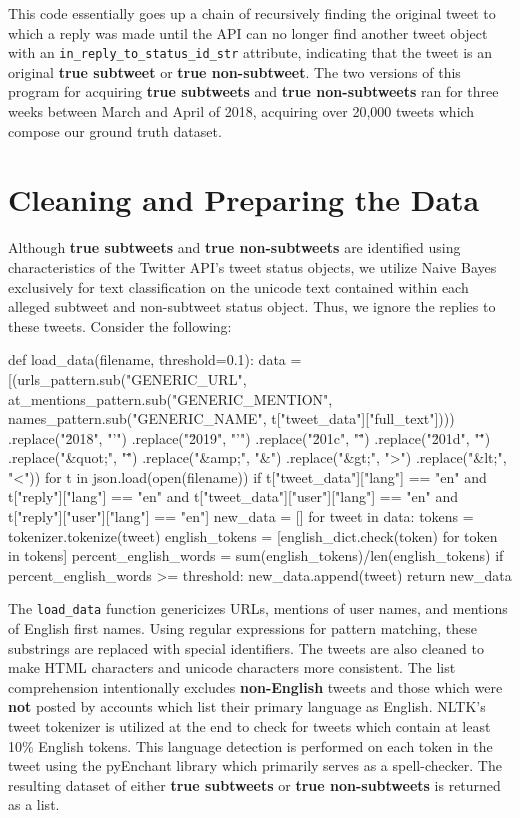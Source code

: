\documentclass[11pt, twoside, reqno]{book}
\begin{document}
\noindent
This code essentially goes up a chain of recursively finding the original tweet to which a reply was made until the API can no longer find another tweet object with an \verb|in_reply_to_status_id_str| attribute, indicating that the tweet is an original \textbf{true subtweet} or \textbf{true non-subtweet}. The two versions of this program for acquiring \textbf{true subtweets} and \textbf{true non-subtweets} ran for three weeks between March and April of 2018, acquiring over 20,000 tweets which compose our ground truth dataset.

\section{Cleaning and Preparing the Data}
\label{cleaning_data}

Although \textbf{true subtweets} and \textbf{true non-subtweets} are identified using characteristics of the Twitter API's tweet status objects, we utilize Naive Bayes exclusively for text classification on the unicode text contained within each alleged subtweet and non-subtweet status object. Thus, we ignore the replies to these tweets. Consider the following:
\pagebreak
\begin{python}
def load_data(filename, threshold=0.1):
    data = [(urls_pattern.sub("GENERIC_URL",
             at_mentions_pattern.sub("GENERIC_MENTION",
             names_pattern.sub("GENERIC_NAME",
             t["tweet_data"]["full_text"])))
             .replace("\u2018", "'")
             .replace("\u2019", "'")
             .replace("\u201c", "\"")
             .replace("\u201d", "\"")
             .replace("&quot;", "\"")
             .replace("&amp;", "&")
             .replace("&gt;", ">")
             .replace("&lt;", "<"))
            for t in json.load(open(filename))
            if t["tweet_data"]["lang"] == "en"
            and t["reply"]["lang"] == "en"
            and t["tweet_data"]["user"]["lang"] == "en"
            and t["reply"]["user"]["lang"] == "en"]
    new_data = []
    for tweet in data:
        tokens = tokenizer.tokenize(tweet)
        english_tokens = [english_dict.check(token) for token in tokens]
        percent_english_words = sum(english_tokens)/len(english_tokens)
        if percent_english_words >= threshold:
            new_data.append(tweet)
    return new_data
\end{python}
\noindent
The \verb|load_data| function genericizes URLs, mentions of user names, and mentions of English first names. Using regular expressions for pattern matching, these substrings are replaced with special identifiers. The tweets are also cleaned to make HTML characters and unicode characters more consistent. The list comprehension intentionally excludes \textbf{non-English} tweets and those which were \textbf{not} posted by accounts which list their primary language as English. NLTK's tweet tokenizer is utilized at the end to check for tweets which contain at least 10\% English tokens. This language detection is performed on each token in the tweet using the pyEnchant library \cite{pyenchant} which primarily serves as a spell-checker. The resulting dataset of either \textbf{true subtweets} or \textbf{true non-subtweets} is returned as a list.
\end{document}
